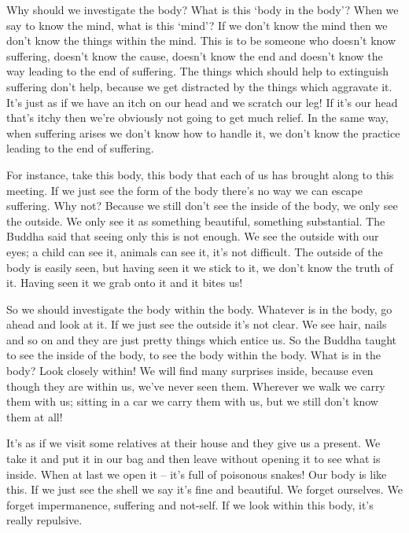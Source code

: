 Why should we investigate the body? What is this `body in the body'? When we say to know the mind, what is this `mind'? If we don't know the mind then we don't know the things within the mind. This is to be someone who doesn't know suffering, doesn't know the cause, doesn't know the end and doesn't know the way leading to the end of suffering. The things which should help to extinguish suffering don't help, because we get distracted by the things which aggravate it. It's just as if we have an itch on our head and we scratch our leg! If it's our head that's itchy then we're obviously not going to get much relief. In the same way, when suffering arises we don't know how to handle it, we don't know the practice leading to the end of suffering.

For instance, take this body, this body that each of us has brought along to this meeting. If we just see the form of the body there's no way we can escape suffering. Why not? Because we still don't see the inside of the body, we only see the outside. We only see it as something beautiful, something substantial. The Buddha said that seeing only this is not enough. We see the outside with our eyes; a child can see it, animals can see it, it's not difficult. The outside of the body is easily seen, but having seen it we stick to it, we don't know the truth of it. Having seen it we grab onto it and it bites us!

So we should investigate the body within the body. Whatever is in the body, go ahead and look at it. If we just see the outside it's not clear. We see hair, nails and so on and they are just pretty things which entice us. So the Buddha taught to see the inside of the body, to see the body within the body. What is in the body? Look closely within! We will find many surprises inside, because even though they are within us, we've never seen them. Wherever we walk we carry them with us; sitting in a car we carry them with us, but we still don't know them at all!

It's as if we visit some relatives at their house and they give us a present. We take it and put it in our bag and then leave without opening it to see what is inside. When at last we open it -- it's full of poisonous snakes! Our body is like this. If we just see the shell we say it's fine and beautiful. We forget ourselves. We forget impermanence, suffering and not-self. If we look within this body, it's really repulsive.

